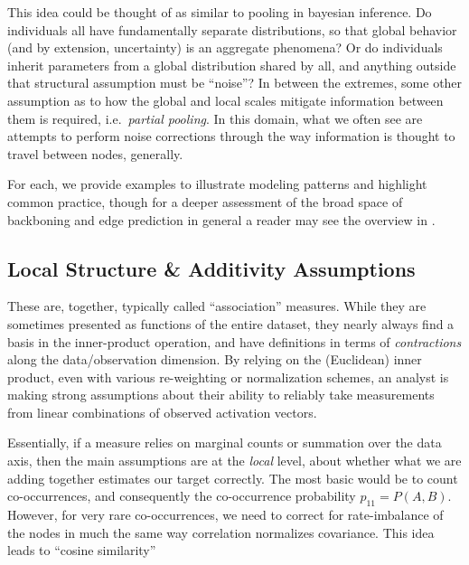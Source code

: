 \documentclass[%
	12pt,
		oneside,
		letterpaper
]{book}
\begin{document}
This idea could be thought of as similar to pooling in bayesian
inference. Do individuals all have fundamentally separate distributions,
so that global behavior (and by extension, uncertainty) is an aggregate
phenomena? Or do individuals inherit parameters from a global
distribution shared by all, and anything outside that structural
assumption must be ``noise''? In between the extremes, some other
assumption as to how the global and local scales mitigate information
between them is required, i.e.~\emph{partial pooling}. In this domain,
what we often see are attempts to perform noise corrections through the
way information is thought to travel between nodes, generally.

For each, we provide examples to illustrate modeling patterns and
highlight common practice, though for a deeper assessment of the broad
space of backboning and edge prediction in general a reader may see the
overview in \textcite{atlasaspiringnetwork_Coscia2021}.

\subsection{Local Structure \& Additivity
Assumptions}\label{local-structure-additivity-assumptions}

These are, together, typically called ``association'' measures. While
they are sometimes presented as functions of the entire dataset, they
nearly always find a basis in the inner-product operation, and have
definitions in terms of \emph{contractions} along the data/observation
dimension. By relying on the (Euclidean) inner product, even with
various re-weighting or normalization schemes, an analyst is making
strong assumptions about their ability to reliably take measurements
from linear combinations of observed activation vectors.

Essentially, if a measure relies on marginal counts or summation over
the data axis, then the main assumptions are at the \emph{local} level,
about whether what we are adding together estimates our target
correctly. The most basic would be to count co-occurrences, and
consequently the co-occurrence probability \(p_{11}=P(A,B)\). However,
for very rare co-occurrences, we need to correct for rate-imbalance of
the nodes in much the same way correlation normalizes covariance. This
idea leads to ``cosine similarity''
\end{document}
